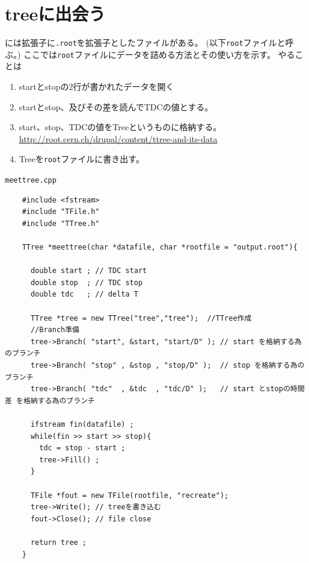 \clearpage
 \section{treeに出会う}

 \ROOT には拡張子に\verb|.root|を拡張子としたファイルがある。
 (以下\verb|root|ファイルと呼ぶ。)
 ここでは\verb|root|ファイルにデータを詰める方法とその使い方を示す。
 やることは
 \begin{enumerate}
  \item startとstopの2行が書かれたデータを開く
  \item startとstop、及びその差を読んでTDCの値とする。
  \item start、stop、TDCの値をTreeというものに格納する。\\
	\url{http://root.cern.ch/drupal/content/ttree-and-its-data}
  \item Treeを\verb|root|ファイルに書き出す。
 \end{enumerate}

 \begin{itembox}{\texttt{meettree.cpp}}
\begin{verbatim}
	#include <fstream>
	#include "TFile.h"
	#include "TTree.h"

	TTree *meettree(char *datafile, char *rootfile = "output.root"){

	  double start ; // TDC start
	  double stop  ; // TDC stop
	  double tdc   ; // delta T

	  TTree *tree = new TTree("tree","tree");  //TTree作成
	  //Branch準備
	  tree->Branch( "start", &start, "start/D" ); // start を格納する為のブランチ
	  tree->Branch( "stop" , &stop , "stop/D" );  // stop を格納する為のブランチ
	  tree->Branch( "tdc"  , &tdc  , "tdc/D" );   // start とstopの時間差 を格納する為のブランチ

	  ifstream fin(datafile) ;
	  while(fin >> start >> stop){
	    tdc = stop - start ;
	    tree->Fill() ;
	  }

	  TFile *fout = new TFile(rootfile, "recreate");
	  tree->Write(); // treeを書き込む
	  fout->Close(); // file close

	  return tree ;
	}
\end{verbatim}
 \end{itembox}

